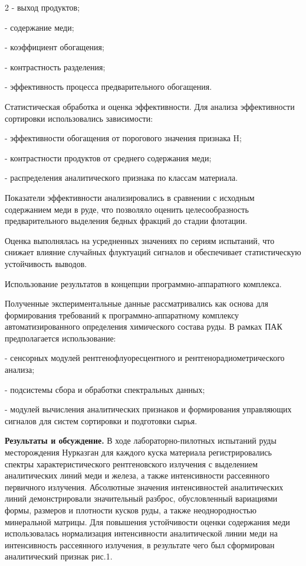 \begin{multicols}{2}
- выход продуктов;

- содержание меди;

- коэффициент обогащения;

- контрастность разделения;

- эффективность процесса предварительного обогащения.

Статистическая обработка и оценка эффективности. Для анализа
эффективности сортировки использовались зависимости:

- эффективности обогащения от порогового значения признака H;

- контрастности продуктов от среднего содержания меди;

- распределения аналитического признака по классам материала.

Показатели эффективности анализировались в сравнении с исходным
содержанием меди в руде, что позволяло оценить целесообразность
предварительного выделения бедных фракций до стадии флотации.

Оценка выполнялась на усредненных значениях по сериям испытаний, что
снижает влияние случайных флуктуаций сигналов и обеспечивает
статистическую устойчивость выводов.

Использование результатов в концепции программно-аппаратного комплекса.

Полученные экспериментальные данные рассматривались как основа для
формирования требований к программно-аппаратному комплексу
автоматизированного определения химического состава руды. В рамках ПАК
предполагается использование:

- сенсорных модулей рентгенофлуоресцентного и рентгенорадиометрического
анализа;

- подсистемы сбора и обработки спектральных данных;

- модулей вычисления аналитических признаков и формирования управляющих
сигналов для систем сортировки и подготовки сырья.

{\bfseries Результаты и обсуждение.} В ходе лабораторно-пилотных испытаний
руды месторождения Нурказган для каждого куска материала
регистрировались спектры характеристического рентгеновского излучения с
выделением аналитических линий меди и железа, а также интенсивности
рассеянного первичного излучения. Абсолютные значения интенсивностей
аналитических линий демонстрировали значительный разброс, обусловленный
вариациями формы, размеров и плотности кусков руды, а также
неоднородностью минеральной матрицы. Для повышения устойчивости оценки
содержания меди использовалась нормализация интенсивности аналитической
линии меди на интенсивность рассеянного излучения, в результате чего был
сформирован аналитический признак рис.1.
\end{multicols}

